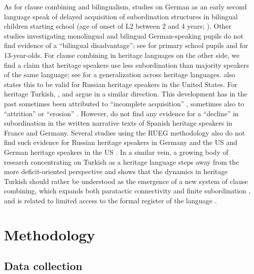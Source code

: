 \documentclass[output=paper,colorlinks,citecolor=brown]{langscibook}
\begin{document}
As for clause combining and bilingualism, studies on German as an early second language speak of delayed acquisition of subordination structures in bilingual children starting school (age of onset of L2 between 2 and 4 years; \cite{grimm2014sprachfahigkeiten}). Other studies investigating monolingual and bilingual German-speaking pupils do not find evidence of a “bilingual disadvantage”; see \textcite{goschler2017syntaxerwerb} for primary school pupils and \parencite{haberzettl2016bildungssprache}  for 13-year-olds. For clause combining in heritage languages on the other side, we find a claim that heritage speakers use less subordination than majority speakers of the same language; see \textcite[47]{polinsky2018heritage} for a generalization across heritage languages. \textcite{polinsly2008} also states this to be valid for Russian heritage speakers in the United States. For heritage Turkish, \textcite{treffers2006oral} , \textcite{bayram2013acquisition}  and \textcite{worfel2022adverbial} argue in a similar direction. This development has in the past sometimes been attributed to “incomplete acquisition” 
 \parencite{polinsly2008,bayram2013acquisition}, sometimes also to “attrition” \parencite{yagmur1997first} or “erosion” \parencite{dussias2004parsing}. However, \textcite{sanchez2017syntactic} do not find any evidence for a “decline” in subordination in the written narrative texts of Spanish heritage speakers in France and Germany. Several studies using the RUEG methodology also do not find such evidence for Russian heritage speakers in Germany and the US and German heritage speakers in the US \parencite{martynova2024use,pashkova2022syntactic,tsehaye2023light}. In a similar vein, a growing body of research concentrating on Turkish as a heritage language steps away from the more deficit-oriented perspective and shows that the dynamics in heritage Turkish should rather be understood as the emergence of a new system of clause combining, which expands both paratactic connectivity and finite subordination \parencite{herkenrath2003interrogative,karakocc2007connectivity,onar2015transformation,schroeder2016clause,ozsoy2022shifting,Keskinetal_ir}, and is related to limited access to the formal register of the language \parencite[cf.][57]{aalberse2019heritage}.

\section{Methodology} \label{sec:schroederetal:2}

\subsection{Data collection} \label{schroederetal:2.1}
\end{document}
